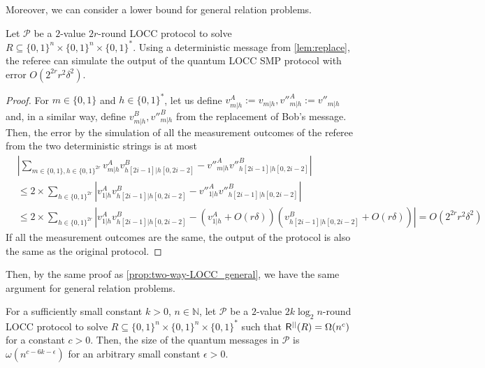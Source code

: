 Moreover, we can consider a lower bound for general relation problems.

\begin{lemma}
    Let $\mathcal{P}$ be a $2$-value $2r$-round LOCC protocol to solve $R \subseteq \{0,1\}^n \times \{0,1\}^n \times \{0,1\}^*$. Using a deterministic message from \cref{lem:replace}, the referee can simulate the output of the quantum LOCC SMP protocol with error $O(2^{2r}r^2\delta^2)$.
\end{lemma}

\begin{proof}
For $m \in \{0,1\}$ and $h \in \{0,1\}^*$, let us define $v^A_{m|h} := v_{m|h}, v''^A_{m|h} := v''_{m|h}$ and, in a similar way, define $v^B_{m|h}, v''^B_{m|h}$ from the replacement of Bob's message.
Then, the error by the simulation of all the measurement outcomes of the referee from the two deterministic strings is at most
\begin{align*}
    & \left| \sum_{m \in \{0,1\}, h \in \{0,1\}^{2r}} v^A_{m|h} v^B_{h[2i-1]|h[0,2i-2]} - v''^A_{m|h} v''^B_{h[2i-1]|h[0,2i-2]} \right| \\
    & \leq 2 \times \sum_{h \in \{0,1\}^{2r}} \left| v^A_{1|h} v^B_{h[2i-1]|h[0,2i-2]} - v''^A_{1|h} v''^B_{h[2i-1]|h[0,2i-2]} \right| \\
    & \leq 2 \times \sum_{h \in \{0,1\}^{2r}} \left| v^A_{1|h} v^B_{h[2i-1]|h[0,2i-2]} - \left( v^A_{1|h} + O(r\delta) \right) \left( v^B_{h[2i-1]|h[0,2i-2]} + O(r\delta) \right) \right| = O(2^{2r}r^2\delta^2) 
\end{align*}
If all the measurement outcomes are the same, the output of the protocol is also the same as the original protocol.
\end{proof}

Then, by the same proof as \cref{prop:two-way-LOCC_general}, we have the same argument for general relation problems.

\begin{theorem}\label{thm:two-way-LOCC_general_relation}
    For a sufficiently small constant $k>0$, $n \in\mathbb{N}$, let $\mathcal{P}$ be a $2$-value $2k \log_2 n$-round LOCC protocol to solve $R \subseteq \{0,1\}^n \times \{0,1\}^n \times \{0,1\}^*$ such that $\mathsf{R}^{||}(R) = \Omega(n^c)$ for a constant $c>0$. Then, the size of the quantum messages in $\mathcal{P}$ is $\omega(n^{c-6k-\epsilon})$ for an arbitrary small constant $\epsilon >0$.
\end{theorem}
